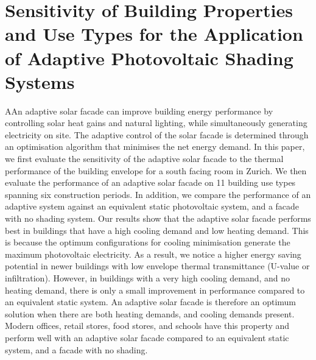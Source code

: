 
\chapter{Sensitivity of Building Properties and Use Types for the Application of Adaptive Photovoltaic Shading Systems}
\label{ch:asfArchetype}

\graphicspath{{chapters/ch3Archetype//Images/}}

\begin{chapterabstract}
AAn adaptive solar facade can improve building energy performance by controlling solar heat gains and natural lighting, while simultaneously generating electricity on site. The adaptive control of the solar facade is determined through an optimisation algorithm that minimises the net energy demand. In this paper, we first evaluate the sensitivity of the adaptive solar facade to the thermal performance of the building envelope for a south facing room in Zurich. We then evaluate the performance of an adaptive solar facade on 11 building use types spanning six construction periods. In addition, we compare the performance of an adaptive system against an equivalent static photovoltaic system, and a facade with no shading system. Our results show that the adaptive solar facade performs best in buildings that have a high cooling demand and low heating demand. This is because the optimum configurations for cooling minimisation generate the maximum photovoltaic electricity. As a result, we notice a higher energy saving potential in newer buildings with low envelope thermal transmittance (U-value or infiltration). However, in buildings with a very high cooling demand, and no heating demand, there is only a small improvement in performance compared to an equivalent static system. An adaptive solar facade is therefore an optimum solution when there are both heating demands, and cooling demands present. Modern offices, retail stores, food stores, and schools have this property and perform well with an adaptive solar facade compared to an equivalent static system, and a facade with no shading.
\end{chapterabstract}


\newpage

